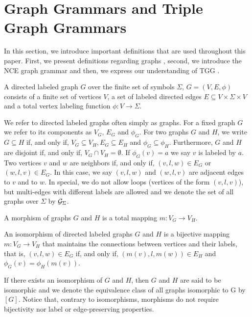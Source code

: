 \documentclass[runningheads]{llncs}
\begin{document}
\section{Graph Grammars and Triple Graph Grammars}
\label{sec:gg-tgg}
In this section, we introduce important definitions that are used throughout this paper. First, we present definitions regarding graphs \cite{rozenberg1986boundary}, second, we introduce the NCE graph grammar \cite{janssens1982graph,kim2001efficient} and then, we express our understanding of TGG \cite{schurr1994specification}.

\begin{definition}
	\label{def:graph}
	A directed labeled graph $G$ over the finite set of symbols $\Sigma$, $G = (V, E, \phi)$ consists of a finite set of vertices $V$, a set of labeled directed edges $E \subseteq V \times \Sigma \times V$ and a total vertex labeling function $\phi : V \to \Sigma$. 
\end{definition}

We refer to directed labeled graphs often simply as graphs. For a fixed graph $G$ we refer to its components as $V_G$, $E_G$ and $\phi_G$. For two graphs $G$ and $H$, we write $G \subseteq H$ if, and only if, $V_G \subseteq V_H, E_G \subseteq E_H$ and $\phi_G \subseteq \phi_H$. Furthermore, $G$ and $H$ are disjoint if, and only if, $V_G \cap V_H = \emptyset$. If $\phi_G(v) = a$ we say $v$ is labeled by $a$. Two vertices $v$ and $w$ are neighbors if, and only if, $(v,l,w) \in E_G$ or $(w,l,v) \in E_G$. In this case, we say $(v,l,w)$ and $(w,l,v)$ are adjacent edges to $v$ and to $w$. In special, we do not allow loops (vertices of the form $(v,l,v)$), but multi-edges with different labels are allowed and we denote the set of all graphs over $\Sigma$ by $\mathcal{G}_{\Sigma}$.

\begin{definition}
	\label{def:morphism}
	A morphism of graphs $G$ and $H$ is a total mapping $m: V_G \to V_H$.
\end{definition}

\begin{definition}
	An isomorphism of directed labeled graphs $G$ and $H$ is a bijective mapping $m: V_G \to V_H$ that maintains the connections between vertices and their labels, that is, $(v,l,w) \in E_G$ if, and only if, $(m(v),l,m(w)) \in E_H$ and $\phi_G(v) = \phi_H(m(v))$.
\end{definition}

If there exists an isomorphism of $G$ and $H$, then $G$ and $H$ are said to be isomorphic and we denote the equivalence class of all graphs isomorphic to G by $[G]$. Notice that, contrary to isomorphisms, morphisms do not require bijectivity nor label or edge-preserving properties.
\end{document}
